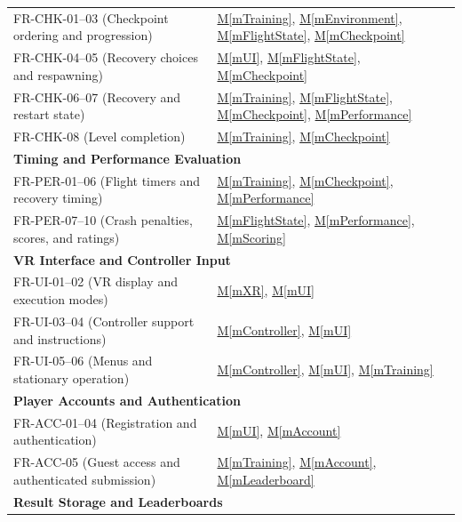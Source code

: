 \documentclass[12pt, titlepage]{article}
\newcommand{\mref}[1]{\hyperref[#1]{M\ref*{#1}}}
\begin{document}
\begin{longtable}{p{} p{}}
FR-CHK-01--03 (Checkpoint ordering and progression)
& \mref{mTraining}, \mref{mEnvironment}, \mref{mFlightState},
\mref{mCheckpoint} \\

FR-CHK-04--05 (Recovery choices and respawning)
& \mref{mUI}, \mref{mFlightState},
\mref{mCheckpoint} \\

FR-CHK-06--07 (Recovery and restart state)
& \mref{mTraining}, \mref{mFlightState}, \mref{mCheckpoint},
\mref{mPerformance} \\

FR-CHK-08 (Level completion)
& \mref{mTraining}, \mref{mCheckpoint} \\

\midrule
\multicolumn{2}{l}{\textbf{Timing and Performance Evaluation}}\\

FR-PER-01--06 (Flight timers and recovery timing)
& \mref{mTraining}, \mref{mCheckpoint},
\mref{mPerformance} \\

FR-PER-07--10 (Crash penalties, scores, and ratings)
& \mref{mFlightState}, \mref{mPerformance},
\mref{mScoring} \\

\midrule
\multicolumn{2}{l}{\textbf{VR Interface and Controller Input}}\\

FR-UI-01--02 (VR display and execution modes)
& \mref{mXR}, \mref{mUI} \\

FR-UI-03--04 (Controller support and instructions)
& \mref{mController}, \mref{mUI} \\

FR-UI-05--06 (Menus and stationary operation)
& \mref{mController}, \mref{mUI},
\mref{mTraining} \\

\midrule
\multicolumn{2}{l}{\textbf{Player Accounts and Authentication}}\\

FR-ACC-01--04 (Registration and authentication)
& \mref{mUI}, \mref{mAccount} \\

FR-ACC-05 (Guest access and authenticated submission)
& \mref{mTraining}, \mref{mAccount},
\mref{mLeaderboard} \\

\midrule
\multicolumn{2}{l}{\textbf{Result Storage and Leaderboards}}\\


\end{longtable}
\end{document}
